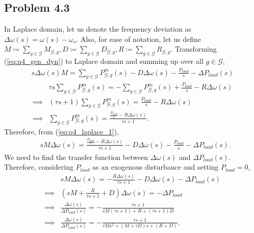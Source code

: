 \subsection*{Problem 4.3}
In Laplace domain, let us denote the frequency deviation as $\Delta \omega(s) = \omega(s)-\omega_s$. Also, for ease of notation, let us define $M \coloneqq \sum_{g\in \mathcal{G}}M_{\mathcal{G},g}, D \coloneqq \sum_{g\in \mathcal{G}}D_{\mathcal{G},g}, R \coloneqq \sum_{g\in \mathcal{G}}R_{\mathcal{G},g}$. Transforming (\ref{eq:q4_gen_dyn}) to Laplace domain and summing up over all $g \in \mathcal{G}$,
\begin{align}\label{eq:q4_laplace_1}
	s\Delta\omega(s)M  = \sum_{g\in \mathcal{G}}P_{\mathcal{G},g}^m(s)-D\Delta \omega(s)-\frac{P_{load}}{s}-\Delta P_{load}(s)
\end{align}
\begin{align*}
	&\tau s \sum_{g\in \mathcal{G}}P_{\mathcal{G},g}^m(s) = -\sum_{g\in \mathcal{G}}P_{\mathcal{G},g}^m(s) + \frac{P_{load}}{s} - R \Delta \omega(s)\\
	\implies & (\tau s + 1)\sum_{g\in \mathcal{G}}P_{\mathcal{G},g}^m(s) = \frac{P_{load}}{s}-R\Delta \omega(s)\\
	\implies & \sum_{g\in \mathcal{G}}P_{\mathcal{G},g}^m(s) = \frac{\frac{P_{load}}{s}-R\Delta \omega(s)}{\tau s + 1}.
\end{align*}
Therefore, from (\ref{eq:q4_laplace_1}),
\begin{align*}
	& sM\Delta\omega(s) = \frac{\frac{P_{load}}{s}-R\Delta \omega(s)}{\tau s + 1} - D \Delta \omega(s) - \frac{P_{load}}{s} - \Delta P_{load}(s).
\end{align*}
We need to find the transfer function between $\Delta \omega(s)$ and $\Delta P_{load}(s)$. Therefore, considering $P_{load}$ as an exogenous disturbance and setting $P_{load} = 0$,
\begin{align*}
	& sM\Delta\omega(s) = -\frac{R \Delta \omega(s)}{\tau s + 1}-D \Delta\omega(s)-\Delta P_{load}(s)\\
	\implies & \left(sM + \frac{R}{\tau s +1}+D\right)\Delta \omega(s) = -\Delta P_{load}\\
	\implies & \frac{\Delta \omega(s)}{\Delta P_{load}(s)} = -\frac{\tau s + 1}{sM(\tau s + 1)+R+(\tau s +1)D}\\
	\implies & \frac{\Delta \omega(s)}{\Delta P_{load}(s)} = -\frac{\tau s +1}{\tau M s^2 + (M+\tau D)s+(R+D)}.
\end{align*}
